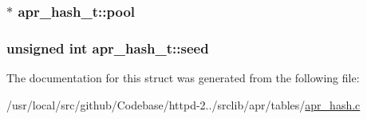 \subsubsection[{\texorpdfstring{pool}{pool}}]{$\ast$ apr\+\_\+hash\+\_\+t\+::pool}\hypertarget{structapr__hash__t_a3cf4d4547e37a14045a52c96721fa264}{}\label{structapr__hash__t_a3cf4d4547e37a14045a52c96721fa264}
\subsubsection[{\texorpdfstring{seed}{seed}}]{\setlength{\rightskip}{0pt plus 5cm}unsigned {\bf int} apr\+\_\+hash\+\_\+t\+::seed}\hypertarget{structapr__hash__t_a99805d60503c1b8384a460f90cde075e}{}\label{structapr__hash__t_a99805d60503c1b8384a460f90cde075e}


The documentation for this struct was generated from the following file\+:\begin{DoxyCompactItemize}
\item 
/usr/local/src/github/\+Codebase/httpd-\/2../srclib/apr/tables/\hyperlink{apr__hash_8c}{apr\+\_\+hash.\+c}\end{DoxyCompactItemize}
